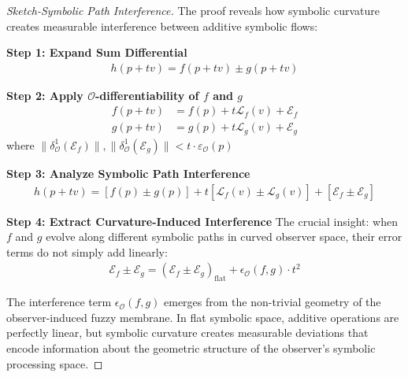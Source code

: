 \begin{proof}[Sketch-Symbolic Path Interference]
\label{proof:bk4_sketch_symbolic_path_interference}
The proof reveals how symbolic curvature creates measurable interference between additive symbolic flows:

\textbf{Step 1: Expand Sum Differential}
\begin{align}
h(p + tv) = f(p + tv) \pm g(p + tv)
\end{align}

\textbf{Step 2: Apply $\mathcal{O}$-differentiability of $f$ and $g$}
\begin{align}
f(p + tv) &= f(p) + t\mathcal{L}_f(v) + \mathcal{E}_f \\
g(p + tv) &= g(p) + t\mathcal{L}_g(v) + \mathcal{E}_g
\end{align}
where $\|\delta^1_{\mathcal{O}}(\mathcal{E}_f)\|, \|\delta^1_{\mathcal{O}}(\mathcal{E}_g)\| < t \cdot \varepsilon_{\mathcal{O}}(p)$

\textbf{Step 3: Analyze Symbolic Path Interference}
\begin{align}
h(p + tv) = [f(p) \pm g(p)] + t[\mathcal{L}_f(v) \pm \mathcal{L}_g(v)] + [\mathcal{E}_f \pm \mathcal{E}_g]
\end{align}

\textbf{Step 4: Extract Curvature-Induced Interference}
The crucial insight: when $f$ and $g$ evolve along different symbolic paths in curved observer space, their error terms do not simply add linearly:
\begin{align}
\mathcal{E}_f \pm \mathcal{E}_g = (\mathcal{E}_f \pm \mathcal{E}_g)_{\text{flat}} + \epsilon_{\mathcal{O}}(f, g) \cdot t^2
\end{align}

The interference term $\epsilon_{\mathcal{O}}(f, g)$ emerges from the non-trivial geometry of the observer-induced fuzzy membrane. In flat symbolic space, additive operations are perfectly linear, but symbolic curvature creates measurable deviations that encode information about the geometric structure of the observer's symbolic processing space.
\end{proof}

